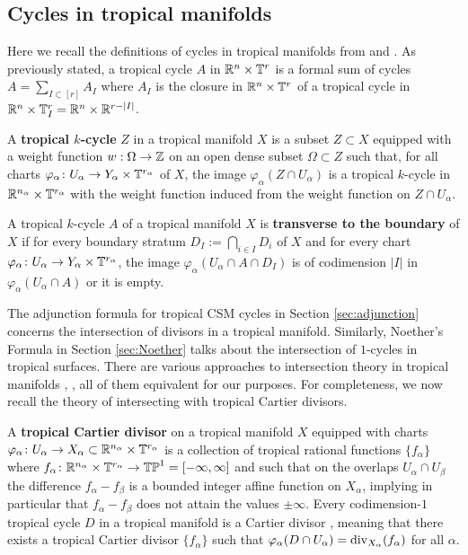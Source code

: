 \subsection{Cycles in tropical manifolds}
Here we recall the definitions of cycles in tropical manifolds from \cite{ShawInt} and  \cite{MikRau}. 
As previously stated, a tropical cycle $A$ in $\mathbb{R}^n \times \mathbb{T}^r$ is a formal sum of cycles $A = \sum_{I \subset [r]} A_I$ where $A_I$ is the closure in $\mathbb{R}^n \times \mathbb{T}^r$ of a tropical cycle in 
$\mathbb{R}^n \times {\mathbb T}^r_I = \mathbb{R}^n \times {\mathbb R}^{r - |I|}$.  

\begin{defi}\label{defi:tropicalCycles}
A \textbf{tropical $k$-cycle} $Z$ in a tropical manifold $X$ is a subset $Z \subset X$ equipped with a weight function $w: \Omega \to {\mathbb Z}$ on an open dense subset $\Omega \subset Z$ such that, for all charts $\varphi_{\alpha} \colon U_{\alpha} \to Y_{\alpha} \times \mathbb{T}^{r_{\alpha}}$ of $X$, the image $\varphi_{\alpha}(Z \cap U_{\alpha})$ is a tropical $k$-cycle in $\mathbb{R}^{n_{\alpha}} \times \mathbb{T}^{r_{\alpha}}$ with the weight function induced from the weight function on $Z \cap U_{\alpha}$. 
\end{defi}


\begin{defi}\label{def:transverse}
A tropical $k$-cycle $A$ of a tropical manifold $X$ is {\bf transverse to the boundary} of $X$ if for every boundary stratum  $D_{I} := \bigcap_{i \in I} D_i$ of $X$ and for every chart $\varphi_{\alpha} \colon U_{\alpha} \to Y_{\alpha} \times \mathbb{T}^{r_{\alpha}}$, the image $\varphi_{\alpha}(U_\alpha \cap A \cap D_I)$ is of codimension $|I|$ in $\varphi_{\alpha}(U_\alpha \cap A)$  or it is empty.
\end{defi}





The adjunction formula for tropical CSM cycles in Section  \ref{sec:adjunction} concerns the intersection of divisors in a tropical manifold. 
Similarly, Noether's Formula in Section \ref{sec:Noether} talks about the 
intersection of $1$-cycles in tropical surfaces. 
There are various approaches to intersection theory in tropical manifolds \cite{ShawThesis}, \cite{FrancoisRau}, all of them equivalent for our purposes. 
For completeness, we now recall the theory of intersecting with tropical Cartier divisors. 

A {\bf tropical Cartier divisor} on a tropical manifold $X$ equipped with charts $\varphi_{\alpha} \colon U_{\alpha} \to X_{\alpha} \subset {\mathbb R}^{n_\alpha} \times \mathbb{T}^{r_{\alpha}}$ is a collection of tropical rational functions $\{f_{\alpha}\}$ where 
$f_{\alpha} \colon \mathbb{R}^{n_{\alpha}} \times \mathbb{T}^{r_{\alpha}} \to \mathbb{TP} ^1 = [-\infty, \infty]$ and such that 
on the overlaps $U_{\alpha} \cap U_{\beta} $ the difference $f_{\alpha} - f_{\beta} $ is a 
bounded integer affine function on $X_{\alpha}$, implying in particular that $f_{\alpha} - f_{\beta} $ does not attain the values $\pm \infty$.
Every codimension-$1$ tropical cycle $D$ in a tropical manifold is a Cartier divisor \cite[Lemma 2.23]{ShawInt}, 
meaning that 
there exists a tropical Cartier divisor $\{f_{\alpha}\}$ such that $\varphi_\alpha (D \cap U_{\alpha}) = \operatorname{div}_{X_{\alpha}}(f_{\alpha})$ for all $\alpha$.  

